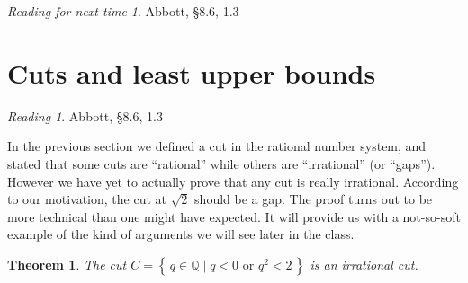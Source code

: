 \documentclass[11pt,oneside]{amsbook}
\newcommand{\set}[1]{\left\{\,#1\,\right\}}
\newcommand{\Q}{\mathbb Q}
\theoremstyle{definition}
\theoremstyle{plain}
\newtheorem{theorem}{Theorem}[section]
\theoremstyle{definition}
\theoremstyle{remark}
\newtheorem*{reading}{Reading}
\newtheorem*{readnext}{Reading for next time}
\numberwithin{equation}{section}
\numberwithin{figure}{section}
\begin{document}
\begin{readnext}
  Abbott, \S 8.6, 1.3
\end{readnext}

\newpage
\section{Cuts and least upper bounds}

\begin{reading}
  Abbott, \S 8.6, 1.3
\end{reading}

In the previous section we defined a cut in the rational number system, and stated that some cuts are ``rational'' while others are ``irrational'' (or ``gaps''). However we have yet to actually prove that any cut is really irrational. According to our motivation, the cut at $\sqrt2$ should be a gap. The proof turns out to be more technical than one might have expected. It will provide us with a not-so-soft example of the kind of arguments we will see later in the class.

\begin{theorem}
  \label{thm:root-2-cut}
  The cut $C=\set{q\in\Q\mid q<0\text{ or }q^2<2}$ is an irrational cut.
\end{theorem}
\end{document}
